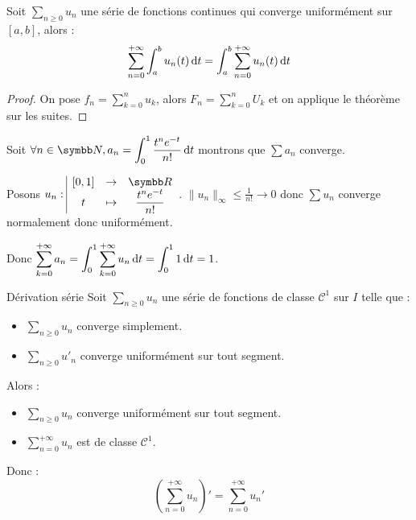 \begin{corollaire}{}{}
    Soit $\sum_{n \geqslant 0} u_n$ une série de fonctions continues qui converge uniformément sur 
    $[a, b]$, alors :
    \[\sum_{n = 0}^{+ \infty} \int_{a}^{b} u_n(t) \,\mathrm{d}t = \int_{a}^{b} \sum_{n = 0}^{+ \infty} u_n(t) \,\mathrm{d}t\]
\end{corollaire}

\begin{proof}
    On pose $\displaystyle f_n = \sum_{k = 0}^n u_k$, alors $\displaystyle F_n = \sum_{k = 0 }^{n } U_k$ et on applique le 
    théorème sur les suites. 
\end{proof}

\begin{exemple}
    Soit $\ds \forall n \in \N, a_n = \int_0^1 \frac{t^ne^{-t}}{n!} \dt$ montrons que $\sum a_n$ converge.

    Posons $\fonction{u_n}{[0,1]}{\R}{t}{\frac{t^ne^{-t}}{n!}}$. $\|u_n\|_{\infty} \leqslant \frac 1 {n!} \to 0$ donc $\sum u_n$ converge normalement donc uniformément.

    Donc $\displaystyle \sum_{k=0}^{+\infty} a_n = \int_0^1 \sum_{k=0}^{+\infty} u_n \,\mathrm{d}t = \int_0^1 1 \,\mathrm{d}t = 1$. 
\end{exemple}

\begin{theoreme}{Dérivation série}{}
    Soit $\sum_{n \geqslant 0} u_n$ une série de fonctions de classe $\mathscr{C}^1$ sur $I$ telle que :
    \begin{itemize}
        \item $\sum_{n \geqslant 0} u_n$ converge simplement.
        \item $\sum_{n \geqslant 0} u'_n$ converge uniformément sur tout segment.
    \end{itemize}
    Alors : 
    \begin{itemize}
        \item $\sum_{n \geqslant 0} u_n$ converge uniformément sur tout segment.
        \item $\displaystyle \sum_{n = 0 }^{+ \infty } u_n$ est de classe $\mathscr C^1$.
    \end{itemize}
    Donc : 
    \[\left(\sum_{n = 0}^{+ \infty} u_n\right)' = \sum_{n = 0 }^{+ \infty } u_n'\]
\end{theoreme}

